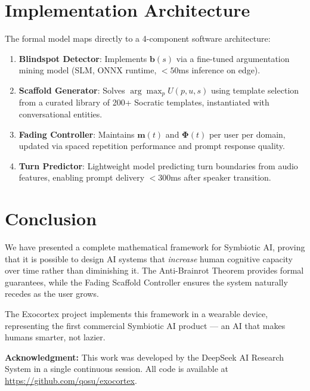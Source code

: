 \documentclass[12pt,a4paper]{article}
\theoremstyle{remark}
\begin{document}
\section{Implementation Architecture}

The formal model maps directly to a 4-component software architecture:

\begin{enumerate}
    \item \textbf{Blindspot Detector}: Implements $\mathbf{b}(s)$ via a fine-tuned argumentation mining model (SLM, ONNX runtime, $<50$ms inference on edge).
    \item \textbf{Scaffold Generator}: Solves $\arg\max_p U(p, u, s)$ using template selection from a curated library of 200+ Socratic templates, instantiated with conversational entities.
    \item \textbf{Fading Controller}: Maintains $\mathbf{m}(t)$ and $\mathbf{\Phi}(t)$ per user per domain, updated via spaced repetition performance and prompt response quality.
    \item \textbf{Turn Predictor}: Lightweight model predicting turn boundaries from audio features, enabling prompt delivery $<300$ms after speaker transition.
\end{enumerate}

\section{Conclusion}

We have presented a complete mathematical framework for Symbiotic AI, proving that it is possible to design AI systems that \emph{increase} human cognitive capacity over time rather than diminishing it. The Anti-Brainrot Theorem provides formal guarantees, while the Fading Scaffold Controller ensures the system naturally recedes as the user grows.

The Exocortex project implements this framework in a wearable device, representing the first commercial Symbiotic AI product — an AI that makes humans smarter, not lazier.

\vspace{12pt}
\noindent\textbf{Acknowledgment:} This work was developed by the DeepSeek AI Research System in a single continuous session. All code is available at \url{https://github.com/qosu/exocortex}.
\end{document}
